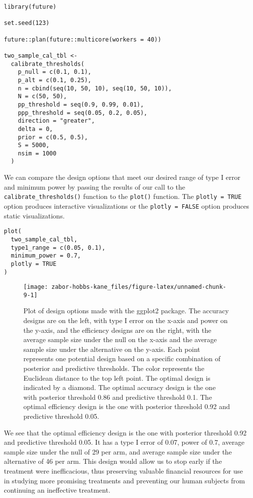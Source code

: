 \begin{verbatim}
library(future)

set.seed(123)

future::plan(future::multicore(workers = 40))

two_sample_cal_tbl <- 
  calibrate_thresholds(
    p_null = c(0.1, 0.1), 
    p_alt = c(0.1, 0.25),
    n = cbind(seq(10, 50, 10), seq(10, 50, 10)),
    N = c(50, 50), 
    pp_threshold = seq(0.9, 0.99, 0.01),
    ppp_threshold = seq(0.05, 0.2, 0.05),
    direction = "greater", 
    delta = 0, 
    prior = c(0.5, 0.5), 
    S = 5000, 
    nsim = 1000
  )
\end{verbatim}

We can compare the design options that meet our desired range of type I error and minimum power by passing the results of our call to the \texttt{calibrate\_thresholds()} function to the \texttt{plot()} function. The \texttt{plotly\ =\ TRUE} option produces interactive visualizations or the \texttt{plotly\ =\ FALSE} option produces static visualizations.

\begin{verbatim}
plot(
  two_sample_cal_tbl, 
  type1_range = c(0.05, 0.1), 
  minimum_power = 0.7,
  plotly = TRUE
)
\end{verbatim}

\begin{figure}
\texttt{[image: zabor-hobbs-kane\_files/figure-latex/unnamed-chunk-9-1]} \caption{Plot of design options made with the {ggplot2} package. The accuracy designs are on the left, with type I error on the x-axis and power on the y-axis, and the efficiency designs are on the right, with the average sample size under the null on the x-axis and the average sample size under the alternative on the y-axis. Each point represents one potential design based on a specific combination of posterior and predictive thresholds. The color represents the Euclidean distance to the top left point. The optimal design is indicated by a diamond. The optimal accuracy design is the one with posterior threshold 0.86 and predictive threshold 0.1. The optimal efficiency design is the one with posterior threshold 0.92 and predictive threshold 0.05.}\label{fig:unnamed-chunk-9}
\end{figure}

We see that the optimal efficiency design is the one with posterior threshold 0.92 and predictive threshold 0.05. It has a type I error of 0.07, power of 0.7, average sample size under the null of 29 per arm, and average sample size under the alternative of 46 per arm. This design would allow us to stop early if the treatment were inefficacious, thus preserving valuable financial resources for use in studying more promising treatments and preventing our human subjects from continuing an ineffective treatment.

